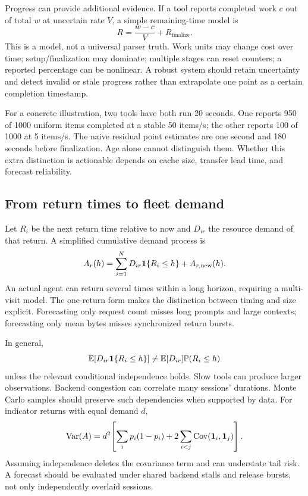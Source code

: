 Progress can provide additional evidence. If a tool reports completed work $c$
out of total $w$ at uncertain rate $V$, a simple remaining-time model is
\begin{equation}
 R=\frac{w-c}{V}+R_{\mathrm{finalize}}.
\end{equation}
This is a model, not a universal parser truth. Work units may change cost over
time; setup/finalization may dominate; multiple stages can reset counters; a
reported percentage can be nonlinear. A robust system should retain uncertainty
and detect invalid or stale progress rather than extrapolate one point as a
certain completion timestamp.

For a concrete illustration, two tools have both run 20 seconds. One reports
950 of 1000 uniform items completed at a stable 50 items/s; the other reports
100 of 1000 at 5 items/s. The naive residual point estimates are one second and
180 seconds before finalization. Age alone cannot distinguish them. Whether
this extra distinction is actionable depends on cache size, transfer lead time,
and forecast reliability.

\subsection{From return times to fleet demand}
Let $R_i$ be the next return time relative to now and $D_{ir}$ the resource demand
of that return. A simplified cumulative demand process is
\begin{equation}
 A_r(h)=\sum_{i=1}^N D_{ir}\mathbf{1}\{R_i\le h\}+A_{r,\mathrm{new}}(h).
 \label{eq:demand}
\end{equation}
An actual agent can return several times within a long horizon, requiring a
multi-visit model. The one-return form makes the distinction between timing and
size explicit. Forecasting only request count misses long prompts and large
contexts; forecasting only mean bytes misses synchronized return bursts.

In general,
\begin{equation}
 \mathbb{E}[D_{ir}\mathbf{1}\{R_i\le h\}]
 \ne \mathbb{E}[D_{ir}]\mathbb{P}(R_i\le h)
\end{equation}
unless the relevant conditional independence holds. Slow tools can produce
larger observations. Backend congestion can correlate many sessions' durations.
Monte Carlo samples should preserve such dependencies when supported by data.
For indicator returns with equal demand $d$,
\begin{equation}
 \operatorname{Var}(A)=d^2\!\left[\sum_i p_i(1-p_i)
 +2\sum_{i<j}\operatorname{Cov}(\mathbf{1}_i,\mathbf{1}_j)\right].
\end{equation}
Assuming independence deletes the covariance term and can understate tail risk.
A forecast should be evaluated under shared backend stalls and release bursts,
not only independently overlaid sessions.

